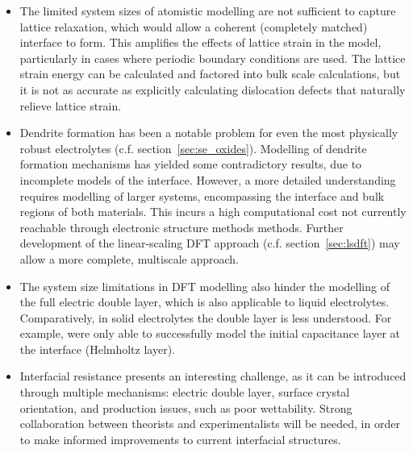 \documentclass[../main.tex]{subfiles}
\begin{document}
\begin{itemize}
    \item The limited system sizes of atomistic modelling are not sufficient to capture lattice relaxation, which would allow a coherent (completely matched) interface to form. This amplifies the effects of lattice strain in the model, particularly in cases where periodic boundary conditions are used.\cite{Lepley2015} The lattice strain energy can be calculated and factored into bulk scale calculations, but it is not as accurate as explicitly calculating dislocation defects that naturally relieve lattice strain.\cite{Rodney2017, Clouet2020}
    \item Dendrite formation has been a notable problem for even the most physically robust electrolytes (c.f. section~\ref{sec:se_oxides}). Modelling of dendrite formation mechanisms has yielded some contradictory results, due to incomplete models of the interface.\cite{Tian2018, Gao2020, Canepa2018} However, a more detailed understanding requires modelling of larger systems, encompassing the interface and bulk regions of both materials. This incurs a high computational cost not currently reachable through electronic structure methods methods. Further development of the linear-scaling DFT approach (c.f. section~\ref{sec:lsdft}) may allow a more complete, multiscale approach.
    \item The system size limitations in DFT modelling also hinder the modelling of the full electric double layer, which is also applicable to liquid electrolytes. Comparatively, in solid electrolytes the double layer is less understood. For example, \citeauthor{Tateyama2019} were only able to successfully model the initial capacitance layer at the interface (Helmholtz layer).\cite{Tateyama2019}
    \item Interfacial resistance presents an interesting challenge, as it can be introduced through multiple mechanisms\cite{Jiang2019}: electric double layer,\cite{Tateyama2019} surface crystal orientation,\cite{Okuno2020} and production issues, such as poor wettability.\cite{Sharafi2017} Strong collaboration between theorists and experimentalists will be needed, in order to make informed improvements to current interfacial structures.
\end{itemize}
\end{document}

